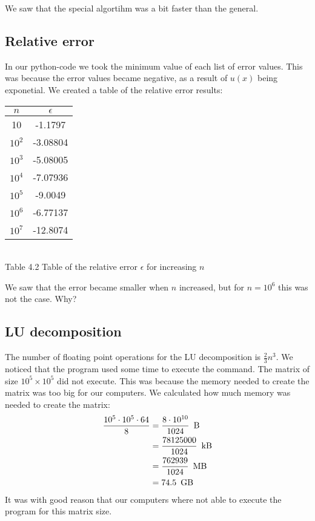 \documentclass[12pt]{article}
\begin{document}
\noindent We saw that the special algortihm was a bit faster than the general. \\


\subsection{Relative error}
\noindent In our python-code we took the minimum value of each list of error values. This was because the error values became negative, as a result of $u(x)$ being exponetial. We created a table of the relative error results:

\begin{center}
\begin{tabular}{ c | c }
	$n$ & $\epsilon$ \\
	\hline
	10 & -1.1797 \\
	$10^2$ & -3.08804 \\
	$10^3$ & -5.08005 \\
	$10^4$ & -7.07936 \\
	$10^5$ & -9.0049 \\
	$10^6$ & -6.77137 \\
	$10^7$ & -12.8074\\ 
\end{tabular}
\medskip
\\
Table 4.2 Table of the relative error $\epsilon$ for increasing $n$
\end{center}

\noindent We saw that the error became smaller when $n$ increased, but for $n = 10^6$ this was not the case. Why?

\subsection{LU decomposition}

\noindent The number of floating point operations for the LU decomposition is $\frac{2}{3}n^3$\citep{LU}. We noticed that the program used some time to execute the command. The matrix of size $10^5 \times 10^5$ did not execute. This was because the memory needed to create the matrix was too big for our computers. We calculated how much memory was needed to create the matrix:
\begin{align*}
    \frac{10^5 \cdot 10^5 \cdot 64}{8} &= \frac{8 \cdot 10^{10}}{1024} \enskip \text{B} \\
    &= \frac{78125000}{1024} \enskip \text{kB} \\
    &= \frac{762939}{1024} \enskip \text{MB} \\
    &= 74.5 \enskip \text{GB}
\end{align*}
\noindent It was with good reason that our computers where not able to execute the program for this matrix size.
\end{document}
